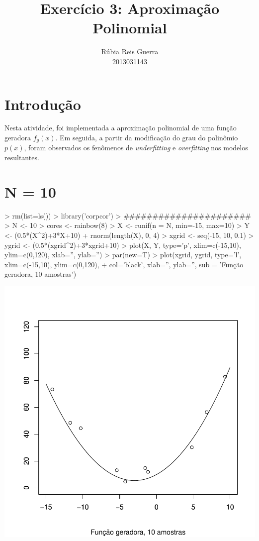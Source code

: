 \documentclass{article}
\title{Exercício 3: Aproximação Polinomial}
\author{Rúbia Reis Guerra \\ 2013031143}
\begin{document}

\maketitle

\section{Introdução}
Nesta atividade, foi implementada a aproximação polinomial de uma função geradora $f_{g}(x)$. Em seguida, a partir da modificação do grau do polinômio $p(x)$, foram observados os fenômenos de \textit{underfitting} e \textit{overfitting} nos modelos resultantes.

\section{N = 10}
\begin{Schunk}
\begin{Sinput}
> rm(list=ls())
> library('corpcor')
> ######################
> N <- 10
> cores <- rainbow(8)
> X <- runif(n = N, min=-15, max=10)
> Y <- (0.5*(X^2)+3*X+10) + rnorm(length(X), 0, 4)
> xgrid <- seq(-15, 10, 0.1)
> ygrid <- (0.5*(xgrid^2)+3*xgrid+10)
> plot(X, Y, type='p', xlim=c(-15,10), ylim=c(0,120), xlab='', ylab='')
> par(new=T)
> plot(xgrid, ygrid, type='l', xlim=c(-15,10), ylim=c(0,120), 
+      col='black', xlab='', ylab='', sub = 'Função geradora, 10 amostras')
\end{Sinput}
\end{Schunk}
\includegraphics{aprox-001}
\end{document}
